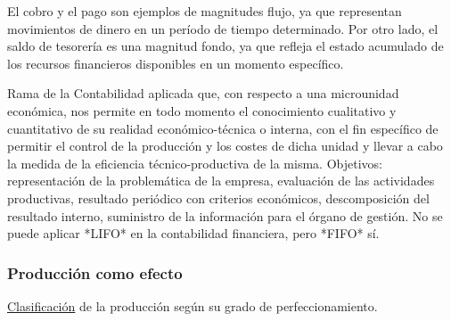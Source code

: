 \documentclass[12pt]{report} %
\begin{document}
\begin{ejemplo}
El cobro y el pago son ejemplos de magnitudes flujo, ya que representan movimientos de dinero en un período de tiempo determinado. Por otro lado, el saldo de tesorería es una magnitud fondo, ya que refleja el estado acumulado de los recursos financieros disponibles en un momento específico.
\end{ejemplo}


\begin{definicion}
Rama de la Contabilidad aplicada que, con respecto a una microunidad económica, nos permite en todo momento el conocimiento cualitativo y cuantitativo de su realidad económico-técnica o interna, con el fin específico de permitir el control de la producción y los costes de dicha unidad y llevar a cabo la medida de la eficiencia técnico-productiva de la misma. Objetivos: representación de la problemática de la empresa, evaluación de las actividades productivas, resultado periódico con criterios económicos, descomposición del resultado interno, suministro de la información para el órgano de gestión. No se puede aplicar *LIFO* en la contabilidad financiera, pero *FIFO* sí.
\end{definicion}

\subsubsection*{Producción como efecto}

\underline{Clasificación} de la producción según su grado de
perfeccionamiento.
\end{document}
